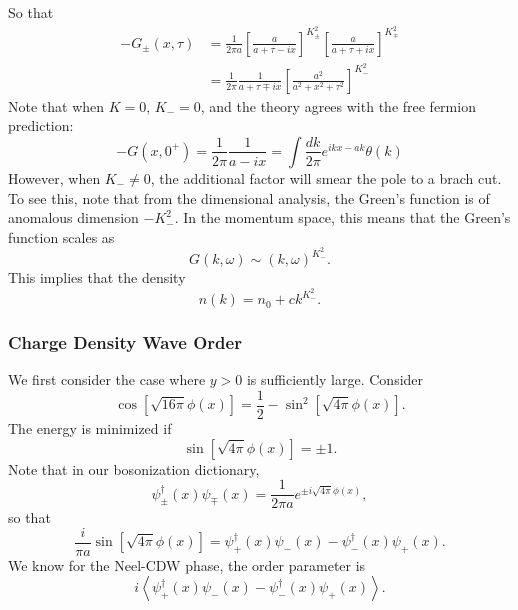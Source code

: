 \documentclass[aps,prb,superscriptaddress,nofootinbib]{revtex4}
\begin{document}
So that
\begin{equation}
\begin{aligned}
	-G_{\pm}(x,\tau) 
	&= \frac{1}{2\pi a} \left[\frac{a}{a + \tau - ix}\right]^{K_\pm^2} \left[\frac{a}{a + \tau + i x}\right]^{K_\mp^2} \\
	&= \frac{1}{2\pi} \frac{1}{a + \tau \mp ix} \left[\frac{a^2}{a^2+x^2+\tau^2}\right]^{K_-^2}
\end{aligned}
\end{equation}
Note that when $K=0$, $K_-=0$, and the theory agrees with the free fermion prediction:
\begin{equation}
	-G(x, 0^+) = \frac{1}{2\pi} \frac{1}{a-ix}
	= \int \frac{dk}{2\pi} e^{ikx-ak} \theta(k)
\end{equation}
However, when $K_- \ne 0$, the additional factor will smear the pole to a brach cut. 
To see this, note that from the dimensional analysis, the Green's function is of anomalous dimension $-K_-^2$.
In the momentum space, this means that the Green's function scales as
\begin{equation}
	G(k,\omega) \sim (k,\omega)^{K_-^2}.
\end{equation}
This implies that the density 
\begin{equation}
	n(k) = n_0 + c k^{K_-^2}.
\end{equation}


\subsubsection{Charge Density Wave Order}
We first consider the case where $y>0$ is sufficiently large. 
Consider
\begin{equation}
	\cos\left[\sqrt{16\pi}\phi(x)\right] = \frac{1}{2} - \sin^2\left[\sqrt{4\pi}\phi(x)\right].
\end{equation}
The energy is minimized if 
\begin{equation}
	\sin\left[\sqrt{4\pi}\phi(x)\right] = \pm 1.
\end{equation}
Note that in our bosonization dictionary,
\begin{equation}
	\psi_{\pm}^\dagger(x)\psi_{\mp}(x) = \frac{1}{2\pi a} e^{\pm i\sqrt{4\pi}\phi(x)},
\end{equation}
so that
\begin{equation}
	\frac{i}{\pi a} \sin\left[\sqrt{4\pi}\phi(x)\right] = \psi_{+}^\dagger(x)\psi_{-}(x)-\psi_{-}^\dagger(x)\psi_{+}(x).
\end{equation}
We know for the Neel-CDW phase, the order parameter is
\begin{equation}
	i\left\langle \psi_{+}^\dagger(x)\psi_{-}(x)-\psi_{-}^\dagger(x)\psi_{+}(x) \right\rangle.
\end{equation}
\end{document}
